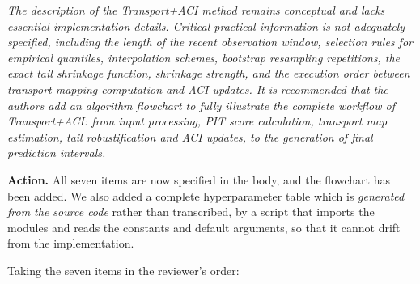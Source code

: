 \documentclass[11pt,a4paper]{article}
\newenvironment{revcomment}
  {\begin{mdframed}[backgroundcolor=quotebg,linecolor=quoterule,linewidth=0.4pt,
    innertopmargin=6pt,innerbottommargin=6pt,skipabove=8pt,skipbelow=8pt]\itshape}
  {\end{mdframed}}
\newcommand{\action}[1]{\textbf{Action.} #1}
\begin{document}
\begin{revcomment}
The description of the Transport+ACI method remains conceptual and lacks essential implementation details. Critical practical information is not adequately specified, including the length of the recent observation window, selection rules for empirical quantiles, interpolation schemes, bootstrap resampling repetitions, the exact tail shrinkage function, shrinkage strength, and the execution order between transport mapping computation and ACI updates. It is recommended that the authors add an algorithm flowchart to fully illustrate the complete workflow of Transport+ACI: from input processing, PIT score calculation, transport map estimation, tail robustification and ACI updates, to the generation of final prediction intervals.
\end{revcomment}

\action{All seven items are now specified in the body, and the flowchart has been added. We also added a complete hyperparameter table which is \emph{generated from the source code} rather than transcribed, by a script that imports the modules and reads the constants and default arguments, so that it cannot drift from the implementation.}

Taking the seven items in the reviewer's order:
\end{document}
